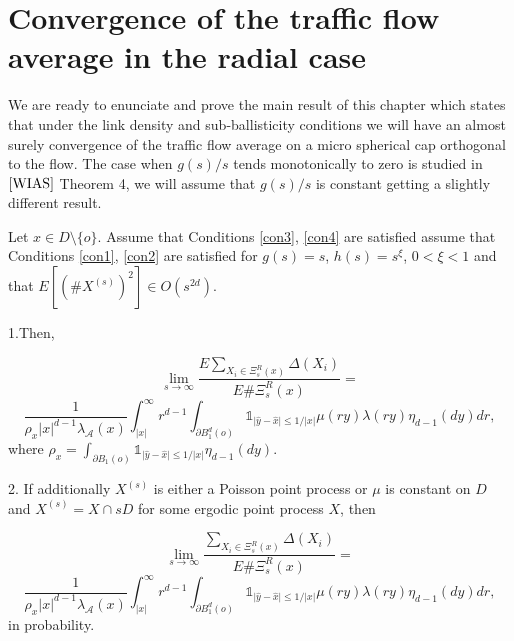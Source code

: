 \section{Convergence of the traffic flow average in the radial case} 
We are ready to enunciate and prove the main result of this chapter which states that under the link density and sub-ballisticity conditions we will have an almost surely convergence of the traffic flow average on a micro spherical cap orthogonal to the flow. The case when $g(s)/s$ tends monotonically to zero is studied in $\cite{WIAS}$ Theorem 4, we will assume that $g(s)/s$ is constant getting a slightly different result.
\begin{thm} Let $x\in D\setminus\lbrace o\rbrace$. Assume that Conditions \ref{con3},  \ref{con4} are satisfied assume that Conditions \ref{con1}, \ref{con2} are satisfied for $g(s)=s$, $h(s)=s^\xi$,  $0<\xi<1$ and that $E[(\#X^{(s)})^2]\in O(s^{2d})$. 

1.Then, 

$$\lim_{s\rightarrow \infty}\frac{E\sum_{X_i\in\Xi^R_s(x)}\Delta(X_i)}{ E\#\Xi^R_s(x)}=$$ $$\frac{1}{\rho_x\vert x\vert^{d-1}\lambda_\mathcal{A}(x)}\int_{\vert x\vert}^{\infty} r^{d-1}\int_{\partial B^d_1(o)} \mathds{1}_{\vert \hat{y}-\hat{x}\vert \leq 1/\vert x\vert}\mu(ry)\lambda(ry)\eta_{d-1}(dy) dr, $$
where $\rho_x=\int_{\partial B_{1}(o)}\mathds{1}_{\vert\hat{y}-\hat{x}\vert\leq 1/\vert x\vert}\eta_{d-1}(dy)$.


2. If additionally $X^{(s)}$ is either a Poisson point process or $\mu$ is constant on $D$ and $X^{(s)}=X\cap sD$ for some ergodic point process $X$, then 

$$\lim_{s\rightarrow \infty}\frac{\sum_{X_i\in\Xi^R_s(x)}\Delta(X_i)}{E\#\Xi^R_s(x)}=$$ $$\frac{1}{\rho_x\vert x\vert^{d-1}\lambda_\mathcal{A}(x)}\int_{\vert x\vert}^{\infty} r^{d-1}\int_{\partial B^d_1(o)} \mathds{1}_{\vert \hat{y}-\hat{x}\vert \leq 1/\vert x\vert}\mu(ry)\lambda(ry)\eta_{d-1}(dy) dr, $$
in probability.
\
\end{thm} 
